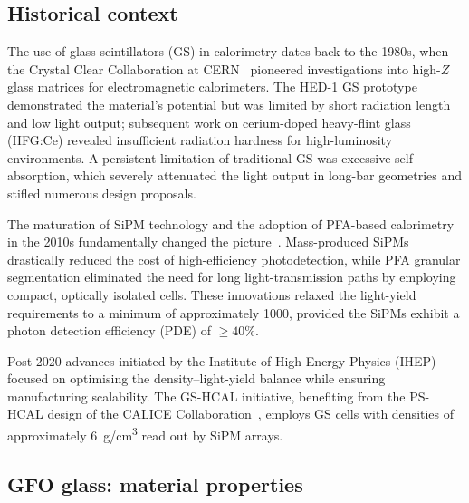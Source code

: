 \documentclass[preprint,12pt,times]{elsarticle}
\begin{document}
\subsection{Historical context}
\label{subsec:history}

The use of glass scintillators (GS) in calorimetry dates back to the
1980s, when the Crystal Clear Collaboration at
CERN~\cite{Buchner:1988fu} pioneered investigations into high-$Z$ glass
matrices for electromagnetic calorimeters.
The HED-1 GS prototype~\cite{Buchner:1988fu} demonstrated the
material's potential but was limited by short radiation length and low
light output; subsequent work on cerium-doped heavy-flint glass
(HFG:Ce) revealed insufficient radiation hardness for high-luminosity
environments.
A persistent limitation of traditional GS was excessive self-absorption,
which severely attenuated the light output in long-bar geometries and
stifled numerous design proposals.

The maturation of SiPM technology and the adoption of PFA-based
calorimetry in the 2010s fundamentally changed the
picture~\cite{Tang:2022yrb,Hu:2023dbm,Hu:2024nvo}.
Mass-produced SiPMs drastically reduced the cost of high-efficiency
photodetection, while PFA granular segmentation eliminated the need for
long light-transmission paths by employing compact, optically isolated
cells.
These innovations relaxed the light-yield requirements to a minimum of
approximately \SI{1000}{\phMeV}, provided the SiPMs exhibit a photon
detection efficiency (PDE) of $\geq40\%$.

Post-2020 advances initiated by the Institute of High Energy Physics
(IHEP)~\cite{LAN2022113000,YU2023113846,ZHU2024} focused on optimising
the density--light-yield balance while ensuring manufacturing
scalability.
The GS-HCAL initiative, benefiting from the PS-HCAL design of the
CALICE Collaboration~\cite{calice,CALICE:2010fpb}, employs GS cells
with densities of approximately \SI{6}{g/cm^{3}} read out by SiPM
arrays.

\subsection{GFO glass: material properties}
\label{subsec:gfo}
\end{document}
